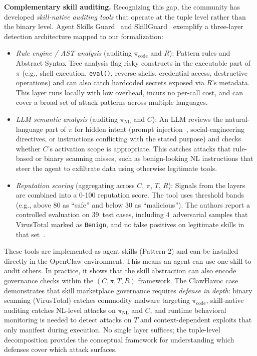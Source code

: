 \documentclass[conference, compsoc]{IEEEtran}
\theoremstyle{plain}
\newcommand{\para}[1]{\smallskip\noindent\textbf{#1.}}
\begin{document}
{\para{Complementary skill auditing} Recognizing this gap, the community has developed \emph{skill-native auditing tools} that operate at the tuple level rather than the binary level. Agent Skills Guard~\cite{agentskillsguard2026} and SkillGuard~\cite{skillguard2026} exemplify a three-layer detection architecture mapped to our formalization:

\begin{itemize}[nosep,leftmargin=1em]
\item \textit{Rule engine / AST analysis} (auditing $\pi_{\text{code}}$ and $R$): Pattern rules and Abstract Syntax Tree analysis flag risky constructs in the executable part of $\pi$ (e.g., shell execution, \texttt{eval()}, reverse shells, credential access, destructive operations) and can also catch hardcoded secrets exposed via $R$'s metadata. This layer runs locally with low overhead, incurs no per-call cost, and can cover a broad set of attack patterns across multiple languages.
\item \textit{LLM semantic analysis} (auditing $\pi_{\text{NL}}$ and $C$): An LLM reviews the natural-language part of $\pi$ for hidden intent (prompt injection~\cite{liu2023jailbreaking}, social-engineering directives, or instructions conflicting with the stated purpose) and checks whether $C$'s activation scope is appropriate. This catches attacks that rule-based or binary scanning misses, such as benign-looking NL instructions that steer the agent to exfiltrate data using otherwise legitimate tools.
\item \textit{Reputation scoring} (aggregating across $C$, $\pi$, $T$, $R$): Signals from the layers are combined into a 0-100 reputation score. The tool uses threshold bands (e.g., above 80 as ``safe'' and below 30 as ``malicious''). The authors report a controlled evaluation on 39~test cases, including 4~adversarial samples that VirusTotal marked as \texttt{Benign}, and no false positives on legitimate skills in that set~\cite{agentskillsguard2026}.
\end{itemize}

These tools are implemented as agent skills (Pattern-2) and can be installed directly in the OpenClaw environment. This means an agent can use one skill to audit others. In practice, it shows that the skill abstraction can also encode governance checks within the $(C, \pi, T, R)$ framework.
The ClawHavoc case demonstrates that skill marketplace governance requires \emph{defense in depth}: binary scanning (VirusTotal) catches commodity malware targeting $\pi_{\text{code}}$, skill-native auditing catches NL-level attacks on $\pi_{\text{NL}}$ and $C$, and runtime behavioral monitoring is needed to detect attacks on $T$ and context-dependent exploits that only manifest during execution. No single layer suffices; the tuple-level decomposition provides the conceptual framework for understanding which defenses cover which attack surfaces.

}
\end{document}
